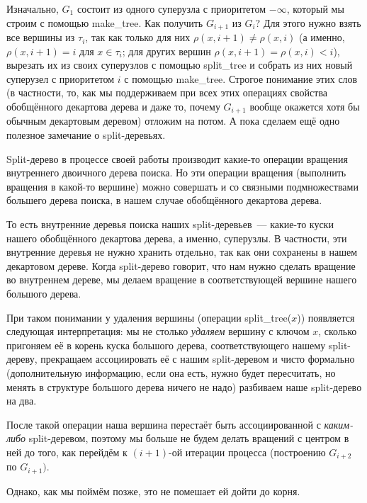 Изначально, $G_1$ состоит из одного суперузла с приоритетом $-\infty$, который мы строим с помощью \textrm{make\_tree}.
Как получить $G_{i + 1}$ из $G_i$? Для этого нужно взять все
вершины из $\tau_i$, так как только для них $\rho(x, i + 1) \neq \rho(x,i)$ (а именно, $\rho(x, i + 1) = i$ для $x \in \tau_i$; для других вершин $\rho(x, i + 1) = \rho(x, i) < i$),
вырезать их из своих суперузлов с помощью \textrm{split\_tree} и собрать из них новый суперузел с приоритетом $i$ с помощью \textrm{make\_tree}. Строгое понимание этих слов (в частности, то, как мы поддерживаем при всех этих операциях свойства обобщённого декартова дерева и даже то, почему $G_{i + 1}$ вообще окажется хотя бы обычным декартовым деревом) отложим на потом. А пока сделаем ещё одно полезное замечание о split-деревьях.

\begin{remark}
	Split-дерево в процессе своей работы производит какие-то операции вращения внутреннего двоичного дерева поиска. Но эти операции вращения (выполнить вращения в какой-то вершине) можно совершать и со связными подмножествами большего дерева поиска, в нашем случае обобщённого декартова дерева.

	То есть внутренние деревья поиска наших split-деревьев~--- какие-то куски нашего
	обобщённого декартова дерева, а именно, суперузлы. В частности, эти внутренние
	деревья не нужно хранить отдельно, так как они сохранены в нашем декартовом дереве.
	Когда split-дерево говорит, что нам нужно сделать вращение во внутреннем дереве, мы делаем вращение в соответствующей вершине нашего большого дерева.

	При таком понимании у удаления вершины (операции \textrm{split\_tree}($x$)) появляется
	следующая интерпретация: мы не столько \emph{удаляем} вершину с ключом $x$, сколько пригоняем её в корень куска большого дерева, соответствующего нашему split-дереву, прекращаем ассоциировать её с нашим split-деревом и чисто формально (дополнительную информацию, если она есть, нужно будет пересчитать, но менять в структуре большого дерева ничего не надо) разбиваем наше split-дерево на два.

	После такой операции наша вершина перестаёт быть ассоциированной с \emph{каким-либо} split-деревом, поэтому мы больше не будем делать вращений с центром в ней до того, как перейдём к $(i + 1)$-ой итерации процесса (построению $G_{i + 2}$ по $G_{i + 1})$.

	Однако, как мы поймём позже, это не помешает ей дойти до корня.
\end{remark}

